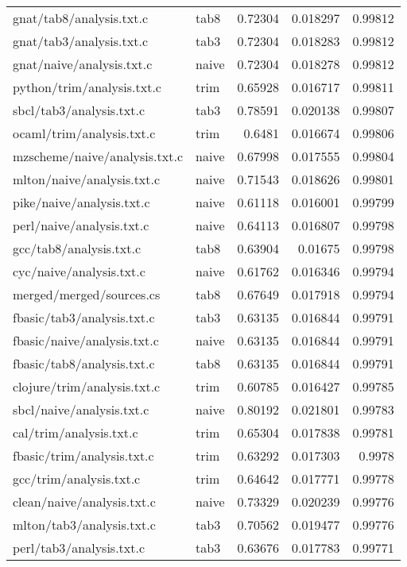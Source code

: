 \begin{longtable}{l l r r r}
{gnat/tab8/analysis.txt.c} & tab8 & 0.72304 & 0.018297 & 0.99812 \\
{gnat/tab3/analysis.txt.c} & tab3 & 0.72304 & 0.018283 & 0.99812 \\
{gnat/naive/analysis.txt.c} & naive & 0.72304 & 0.018278 & 0.99812 \\
{python/trim/analysis.txt.c} & trim & 0.65928 & 0.016717 & 0.99811 \\
{sbcl/tab3/analysis.txt.c} & tab3 & 0.78591 & 0.020138 & 0.99807 \\
{ocaml/trim/analysis.txt.c} & trim & 0.6481 & 0.016674 & 0.99806 \\
{mzscheme/naive/analysis.txt.c} & naive & 0.67998 & 0.017555 & 0.99804 \\
{mlton/naive/analysis.txt.c} & naive & 0.71543 & 0.018626 & 0.99801 \\
{pike/naive/analysis.txt.c} & naive & 0.61118 & 0.016001 & 0.99799 \\
{perl/naive/analysis.txt.c} & naive & 0.64113 & 0.016807 & 0.99798 \\
{gcc/tab8/analysis.txt.c} & tab8 & 0.63904 & 0.01675 & 0.99798 \\
{cyc/naive/analysis.txt.c} & naive & 0.61762 & 0.016346 & 0.99794 \\
{merged/merged/sources.cs} & tab8 & 0.67649 & 0.017918 & 0.99794 \\
{fbasic/tab3/analysis.txt.c} & tab3 & 0.63135 & 0.016844 & 0.99791 \\
{fbasic/naive/analysis.txt.c} & naive & 0.63135 & 0.016844 & 0.99791 \\
{fbasic/tab8/analysis.txt.c} & tab8 & 0.63135 & 0.016844 & 0.99791 \\
{clojure/trim/analysis.txt.c} & trim & 0.60785 & 0.016427 & 0.99785 \\
{sbcl/naive/analysis.txt.c} & naive & 0.80192 & 0.021801 & 0.99783 \\
{cal/trim/analysis.txt.c} & trim & 0.65304 & 0.017838 & 0.99781 \\
{fbasic/trim/analysis.txt.c} & trim & 0.63292 & 0.017303 & 0.9978 \\
{gcc/trim/analysis.txt.c} & trim & 0.64642 & 0.017771 & 0.99778 \\
{clean/naive/analysis.txt.c} & naive & 0.73329 & 0.020239 & 0.99776 \\
{mlton/tab3/analysis.txt.c} & tab3 & 0.70562 & 0.019477 & 0.99776 \\
{perl/tab3/analysis.txt.c} & tab3 & 0.63676 & 0.017783 & 0.99771 \\

\end{longtable}
